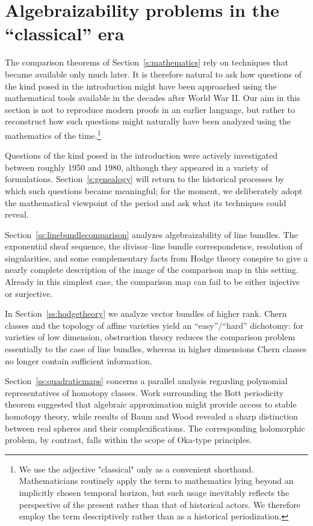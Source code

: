 \documentclass[11pt,leqno]{article}
\renewcommand{\1}{{\rm 1\hspace*{-0.4ex}%
\rule{0.1ex}{1.52ex}\hspace*{0.2ex}}}
\newcommand{\<}[1]{{\langle}#1 {\rangle}}
\newcounter{intro}
\theoremstyle{plain}
\theoremstyle{definition}
\theoremstyle{remark}
\numberwithin{equation}{subsection}
\begin{document}
\section{Algebraizability problems in the ``classical'' era}
\label{s:rationalreconstruction}
The comparison theorems of Section~\ref{s:mathematics} rely on techniques that became available only much later. It is therefore natural to ask how questions of the kind posed in the introduction might have been approached using the mathematical tools available in the decades after World War II. Our aim in this section is not to reproduce modern proofs in an earlier language, but rather to reconstruct how such questions might naturally have been analyzed using the mathematics of the time.\footnote{We use the adjective "classical" only as a convenient shorthand. Mathematicians routinely apply the term to mathematics lying beyond an implicitly chosen temporal horizon, but such usage inevitably reflects the perspective of the present rather than that of historical actors. We therefore employ the term descriptively rather than as a historical periodization.}

Questions of the kind posed in the introduction were actively investigated between roughly 1950 and 1980, although they appeared in a variety of formulations. Section~\ref{s:genealogy} will return to the historical processes by which such questions became meaningful; for the moment, we deliberately adopt the mathematical viewpoint of the period and ask what its techniques could reveal.

Section~\ref{ss:linebundlecomparison} analyzes algebraizability of line bundles. The exponential sheaf sequence, the divisor--line bundle correspondence, resolution of singularities, and some complementary facts from Hodge theory conspire to give a nearly complete description of the image of the comparison map in this setting.  Already in this simplest case, the comparison map can fail to be either injective or surjective.

In Section~\ref{ss:hodgetheory} we analyze vector bundles of higher rank. Chern classes and the topology of affine varieties yield an ``easy''/``hard'' dichotomy: for varieties of low dimension, obstruction theory reduces the comparison problem essentially to the case of line bundles, whereas in higher dimensions Chern classes no longer contain sufficient information.

Section~\ref{ss:quadraticmaps} concerns a parallel analysis regarding polynomial representatives of homotopy classes. Work surrounding the Bott periodicity theorem suggested that algebraic approximation might provide access to stable homotopy theory, while results of Baum and Wood revealed a sharp distinction between real spheres and their complexifications. The corresponding holomorphic problem, by contrast, falls within the scope of Oka-type principles.
\end{document}
